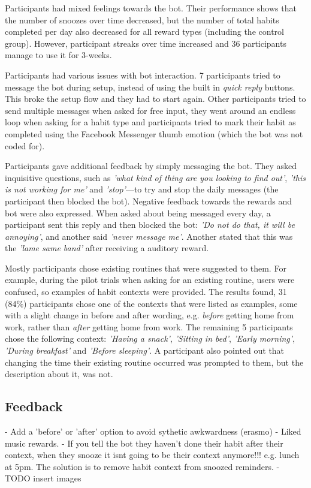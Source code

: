 Participants had mixed feelings towards the bot. Their performance shows that the number of snoozes over time decreased, but the number of total habits completed per day also decreased for all reward types (including the control group). However, participant streaks over time increased and 36 participants manage to use it for 3-weeks.

Participants had various issues with bot interaction. 7 participants tried to message the bot during setup, instead of using the built in \textit{quick reply} buttons. This broke the setup flow and they had to start again. Other participants tried to send multiple messages when asked for free input, they went around an endless loop when asking for a habit type and participants tried to mark their habit as completed using the Facebook Messenger thumb emotion (which the bot was not coded for).

Participants gave additional feedback by simply messaging the bot. They asked inquisitive questions, such as \textit{'what kind of thing are you looking to find out'}, \textit{'this is not working for me'} and \textit{'stop'}---to try and stop the daily messages (the participant then blocked the bot). Negative feedback towards the rewards and bot were also expressed. When asked about being messaged every day, a participant sent this reply and then blocked the bot: \textit{'Do not do that, it will be annoying'}, and another said \textit{'never message me'}. Another stated that this was the \textit{'lame same band'} after receiving a auditory reward.

Mostly participants chose existing routines that were suggested to them. For example, during the pilot trials when asking for an existing routine, users were confused, so examples of habit contexts were provided. The results found, 31 (84\%) participants chose one of the contexts that were listed as examples, some with a slight change in before and after wording, e.g. \textit{before} getting home from work, rather than \textit{after} getting home from work. The remaining 5 participants chose the following context: \textit{'Having a snack'}, \textit{'Sitting in bed'}, \textit{'Early morning'}, \textit{'During breakfast'} and \textit{'Before sleeping'}. A participant also pointed out that changing the time their existing routine occurred was prompted to them, but the description about it, was not.


\subsection*{Feedback}
  - Add a 'before' or 'after' option to avoid sythetic awkwardness (erasmo)
  - Liked music rewards.
  - If you tell the bot they haven't done their habit after their context, when they snooze it isnt going to be their context anymore!!! e.g. lunch at 5pm. The solution is to remove habit context from snoozed reminders.
  - TODO insert images\newline

